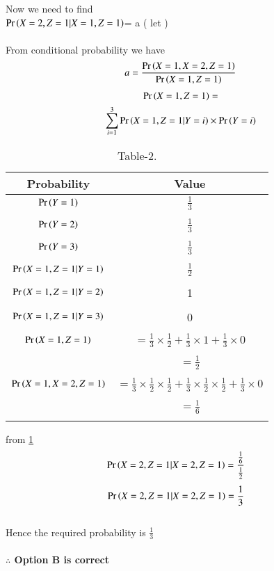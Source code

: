 \documentclass[journal,12pt,twocolumn]{IEEEtran}
\begin{document}
Now we need to find\\ $\Pr\left(X=2,Z=1|X=1,Z=1\right)$= a ( let )\\
\\From conditional probability we have
\begin{align}
    a=\frac{\Pr\left(X=1,X=2,Z=1\right)}{\Pr\left(X=1,Z=1\right)}
\end{align}
\begin{multline}
    \Pr\left(X=1,Z=1\right)=\\
    \sum_{i=1}^{3}\Pr\left(X=1,Z=1|Y=i\right)
    \times \Pr\left(Y=i\right)
\end{multline}
\newpage
\begin{table}[h!]
\resizebox{\columnwidth}{!}
{
    \begin{tabular}{|c|c|}
         \hline
         Probability & Value\\
         \hline
         $\Pr\left(Y=1\right)$ & $\frac{1}{3}$\\&\\
         \hline
         $\Pr\left(Y=2\right)$ & $\frac{1}{3}$\\&\\
         \hline
         $\Pr\left(Y=3\right)$ & $\frac{1}{3}$\\&\\
         \hline
         $\Pr\left(X=1,Z=1|Y=1\right)$ & $\frac{1}{2}$ \\&\\
         \hline
         $\Pr\left(X=1,Z=1|Y=2\right)$ & 1\\&\\
         \hline
         $\Pr\left(X=1,Z=1|Y=3\right)$  & 0 \\&\\
         \hline
         $\Pr\left(X=1,Z=1\right)$ & $=\frac{1}{3}\times \frac{1}{2}+\frac{1}{3}\times 1+\frac{1}{3} \times 0$\\&\\ &$=\frac{1}{2}$\\&\\
         \hline
         $\Pr\left(X=1,X=2,Z=1\right)$ & $=\frac{1}{3}\times \frac{1}{2}\times \frac{1}{2}+\frac{1}{3}\times \frac{1}{2}\times \frac{1}{2}+\frac{1}{3}\times 0$\\&\\&$=\frac{1}{6}$\\&\\
         \hline
    \end{tabular}
    }
    \caption{\label{tab:Table-2}Table-2.}
\end{table}
from \ref{tab:Table-2} 
\begin{align}
\Pr\left(X=2,Z=1|X=2,Z=1\right)&=\frac{\frac{1}{6}}{\frac{1}{2}}
\end{align}
\begin{align}
\Pr\left(X=2,Z=1|X=2,Z=1\right)&=\frac{1}{3}
\end{align}
\\Hence the required probability is $\frac{1}{3}$\\
 \\ \textbf{$\therefore$ Option B is correct}
\end{document}
